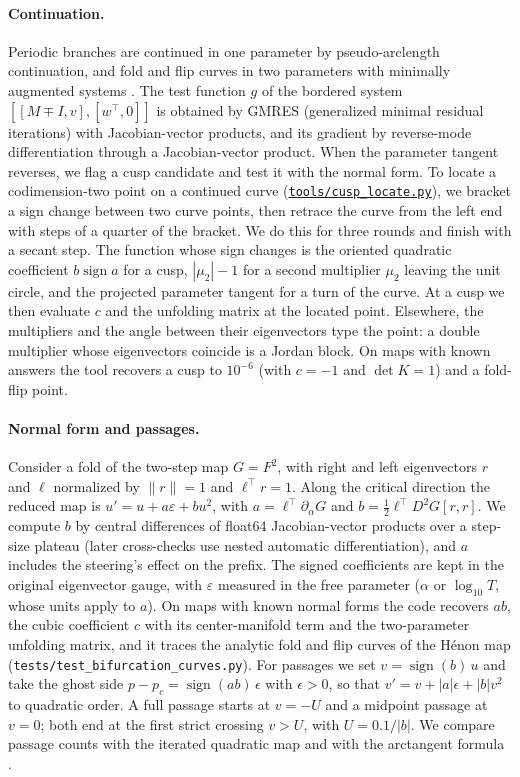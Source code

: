 \documentclass[11pt,letterpaper]{article}
\newcommand{\repourl}{https://github.com/tdj28/neural-shrimp}
\newcommand{\reporef}{arxiv-v1}
\newcommand{\repo}[1]{\href{\repourl/blob/\reporef/#1}{\nolinkurl{#1}}}
\newcommand{\eps}{\varepsilon}
\begin{document}
\paragraph{Continuation.} Periodic branches are continued in one parameter by pseudo-arclength continuation, and fold
and flip curves in two parameters with minimally augmented systems \cite{govaerts2000numerical,kuznetsov2023elements}.
The test function $g$ of the bordered system $[[M\mp I,v],[w^\top,0]]$ is obtained by GMRES (generalized minimal
residual iterations) with Jacobian-vector products, and its gradient by reverse-mode differentiation through a
Jacobian-vector product. When the parameter tangent reverses, we flag a cusp candidate and test it with the normal
form. To locate a codimension-two point on a continued curve (\repo{tools/cusp_locate.py}), we bracket a sign
change between two curve points, then retrace the curve from the left end with steps of a quarter of the bracket.
We do this for three rounds and finish with a secant step. The function whose sign changes is the oriented quadratic
coefficient $b\operatorname{sign}a$ for a cusp, $|\mu_2|-1$ for a second multiplier $\mu_2$ leaving the unit
circle, and the projected parameter tangent for a turn of the curve. At a cusp we then evaluate $c$ and the unfolding
matrix at the located point. Elsewhere, the multipliers and the angle between their eigenvectors type the point: a
double multiplier whose eigenvectors coincide is a Jordan block. On maps with known answers the tool recovers a
cusp to $10^{-6}$ (with $c=-1$ and $\det K=1$) and a fold-flip point.

\paragraph{Normal form and passages.} Consider a fold of the two-step map $G=F^2$, with right and left eigenvectors
$r$ and $\ell$ normalized by $\|r\|=1$ and $\ell^\top r=1$. Along the critical direction the reduced map is
$u'=u+a\eps+bu^2$, with $a=\ell^\top\partial_\alpha G$ and $b=\tfrac12\ell^\top D^2G[r,r]$. We compute $b$ by
central differences of float64 Jacobian-vector products over a step-size plateau (later cross-checks use nested
automatic differentiation), and $a$ includes the steering's effect on the prefix. The signed coefficients are kept in
the original eigenvector gauge, with $\eps$ measured in the free parameter ($\alpha$ or $\log_{10}T$, whose units
apply to $a$). On maps with known normal forms the code recovers $ab$, the cubic coefficient $c$ with its
center-manifold term and the two-parameter unfolding matrix, and it traces the analytic fold and flip curves of the
H\'enon map (\texttt{tests/test\_bifurcation\_curves.py}). For passages we set $v=\operatorname{sign}(b)\,u$ and take the ghost side
$p-p_c=\operatorname{sign}(ab)\,\epsilon$ with $\epsilon>0$, so that $v'=v+|a|\epsilon+|b|v^2$ to quadratic order. A
full passage starts at $v=-U$ and a midpoint passage at $v=0$; both end at the first strict crossing $v>U$, with
$U=0.1/|b|$. We compare passage counts with the iterated quadratic map and with the arctangent formula
\cite{pomeau1980intermittent}.
\end{document}
